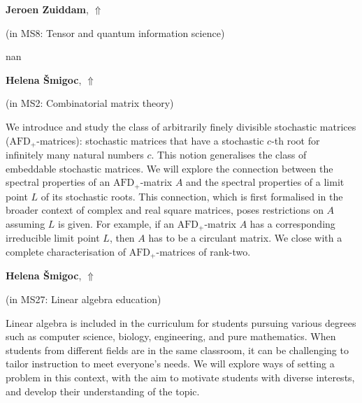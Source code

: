 \documentclass[ILAS2025-program.tex]{subfiles}
\begin{document}
\hypertarget{down0251}{}\begin{ilasabstract}
    
\textbf{Jeroen Zuiddam},  \hfill \hyperlink{up0251}{$\Uparrow$}
    
    
(in {\color{mstitle}MS8: Tensor and quantum information science})
        
\mtskip
    nan
\end{ilasabstract}
    

\hypertarget{down0263}{}\begin{ilasabstract}
    
\textbf{Helena Šmigoc},  \hfill \hyperlink{up0263}{$\Uparrow$}
    
    
(in {\color{mstitle}MS2: Combinatorial matrix theory})
        
\mtskip
    We introduce and study the class of arbitrarily finely divisible stochastic matrices ($\mathrm{AFD}_+$-matrices): stochastic matrices that have a stochastic $c$-th root for infinitely many natural numbers $c$. This notion generalises the class of embeddable stochastic matrices. 
We will explore the connection between the spectral properties of an  $\mathrm{AFD}_+$-matrix $A$ and the spectral properties of a limit point $L$ of its stochastic roots. This connection, which is first formalised in the broader context of complex and real square matrices, poses restrictions on $A$ assuming $L$ is given. For example, if an $\mathrm{AFD}_+$-matrix $A$ has a corresponding irreducible limit point $L$, then $A$ has to be a circulant matrix. We close with a complete characterisation of $\mathrm{AFD}_+$-matrices of rank-two.
\end{ilasabstract}
    

\hypertarget{down0331}{}\begin{ilasabstract}
    
\textbf{Helena Šmigoc},  \hfill \hyperlink{up0331}{$\Uparrow$}
    
    
(in {\color{mstitle}MS27: Linear algebra education})
        
\mtskip
    Linear algebra is included in the curriculum for students pursuing various degrees such as computer science, biology, engineering, and pure mathematics. When students from different fields are in the same classroom, it can be challenging to tailor instruction to meet everyone's needs.  We will explore ways of setting a problem in this context, with the aim to motivate students with diverse interests, and  develop their understanding of the topic.

\end{ilasabstract}
    \newpage
\end{document}
